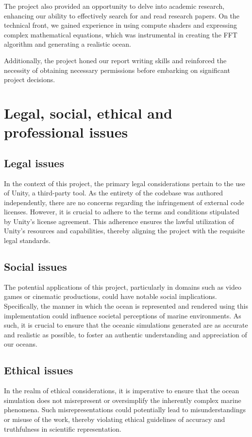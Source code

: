 \begin{appendices}
The project also provided an opportunity to delve into academic research, enhancing our ability to effectively search for and read research papers. On the technical front, we gained experience in using compute shaders and expressing complex mathematical equations, which was instrumental in creating the FFT algorithm and generating a realistic ocean.

Additionally, the project honed our report writing skills and reinforced the necessity of obtaining necessary permissions before embarking on significant project decisions.

\section{Legal, social, ethical and professional issues}

\subsection{Legal issues}
In the context of this project, the primary legal considerations pertain to the use of Unity, a third-party tool. As the entirety of the codebase was authored independently, there are no concerns regarding the infringement of external code licenses. However, it is crucial to adhere to the terms and conditions stipulated by Unity’s license agreement. This adherence ensures the lawful utilization of Unity’s resources and capabilities, thereby aligning the project with the requisite legal standards.

\subsection{Social issues}
The potential applications of this project, particularly in domains such as video games or cinematic productions, could have notable social implications. Specifically, the manner in which the ocean is represented and rendered using this implementation could influence societal perceptions of marine environments. As such, it is crucial to ensure that the oceanic simulations generated are as accurate and realistic as possible, to foster an authentic understanding and appreciation of our oceans.

\subsection{Ethical issues}
In the realm of ethical considerations, it is imperative to ensure that the ocean simulation does not misrepresent or oversimplify the inherently complex marine phenomena. Such misrepresentations could potentially lead to misunderstandings or misuse of the work, thereby violating ethical guidelines of accuracy and truthfulness in scientific representation.


\end{appendices}

